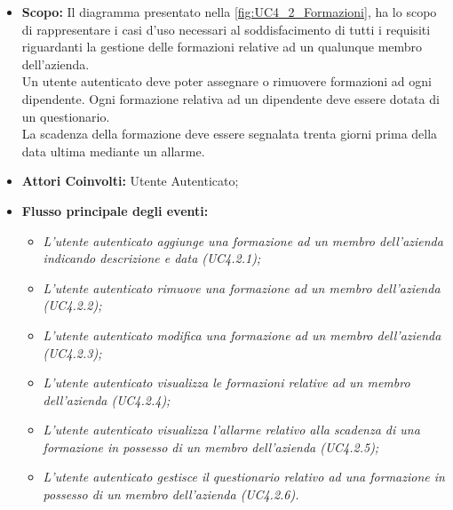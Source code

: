 		\begin{itemize}
			\item \textbf{Scopo:} Il diagramma presentato nella \autoref{fig:UC4_2_Formazioni}, ha lo scopo di rappresentare i casi d'uso necessari al soddisfacimento di tutti i requisiti riguardanti la gestione delle formazioni relative ad un qualunque membro dell'azienda. \\ 
			Un utente autenticato deve poter assegnare o rimuovere formazioni ad ogni dipendente. 
			Ogni formazione relativa ad un dipendente deve essere dotata di un questionario. \\ 
			La scadenza della formazione deve essere segnalata trenta giorni prima della data ultima mediante un allarme.
			\item \textbf{Attori Coinvolti:} Utente Autenticato;
			\item \textbf{Flusso principale degli eventi:} 
			\begin{itemize}
				\item \textit{L'utente autenticato aggiunge una formazione ad un membro dell'azienda indicando descrizione e data (UC4.2.1);}
				\item \textit{L'utente autenticato rimuove una formazione ad un membro dell'azienda (UC4.2.2);}
				\item \textit{L'utente autenticato modifica una formazione ad un membro dell'azienda (UC4.2.3);}
				\item \textit{L'utente autenticato visualizza le formazioni relative ad un membro dell'azienda (UC4.2.4);}
				\item \textit{L'utente autenticato visualizza l'allarme relativo alla scadenza di una formazione in possesso di un membro dell'azienda (UC4.2.5);}
				\item \textit{L'utente autenticato gestisce il questionario relativo ad una formazione in possesso di un membro dell'azienda (UC4.2.6).}
			\end{itemize}
		\end{itemize}
	\newpage	
%	
